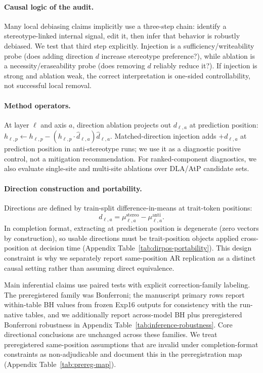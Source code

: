 \paragraph{Causal logic of the audit.}
Many local debiasing claims implicitly use a three-step chain: identify a stereotype-linked internal signal, edit it, then infer that behavior is robustly debiased. We test that third step explicitly. Injection is a sufficiency/writeability probe (does adding direction $d$ increase stereotype preference?), while ablation is a necessity/eraseability probe (does removing $d$ reliably reduce it?). If injection is strong and ablation weak, the correct interpretation is one-sided controllability, not successful local removal.

\paragraph{Method operators.}
At layer $\ell$ and axis $a$, direction ablation projects out $d_{\ell,a}$ at prediction position:
\(h_{\ell,p} \leftarrow h_{\ell,p} - (h_{\ell,p}\cdot \hat d_{\ell,a})\hat d_{\ell,a}\).
Matched-direction injection adds $+d_{\ell,a}$ at prediction position in anti-stereotype runs; we use it as a diagnostic positive control, not a mitigation recommendation. For ranked-component diagnostics, we also evaluate single-site and multi-site ablations over DLA/AtP candidate sets.

\paragraph{Direction construction and portability.}
Directions are defined by train-split difference-in-means at trait-token positions:
\[
d_{\ell,a} = \mu^{\text{stereo}}_{\ell,a} - \mu^{\text{anti}}_{\ell,a}.
\]
In completion format, extracting at prediction position is degenerate (zero vectors by construction), so usable directions must be trait-position objects applied cross-position at decision time (Appendix Table~\ref{tab:dirpos-portability}). This design constraint is why we separately report same-position AR replication as a distinct causal setting rather than assuming direct equivalence.

Main inferential claims use paired tests with explicit correction-family labeling. The preregistered family was Bonferroni; the manuscript primary rows report within-table BH values from frozen Exp16 outputs for consistency with the run-native tables, and we additionally report across-model BH plus preregistered Bonferroni robustness in Appendix Table~\ref{tab:inference-robustness}. Core directional conclusions are unchanged across these families. We treat preregistered same-position assumptions that are invalid under completion-format constraints as non-adjudicable and document this in the preregistration map (Appendix Table~\ref{tab:prereg-map}).

